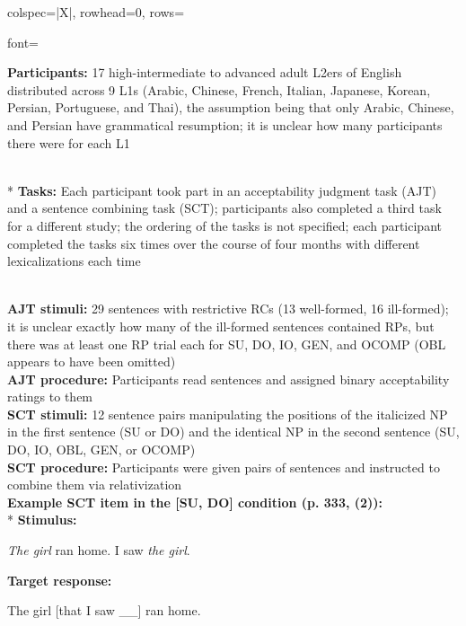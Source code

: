 \begin{longtblr}[caption={\textcite{gass1979}: Experimental design}, label={tblr:gass}]{colspec={|X|}, rowhead=0, rows={font=\raggedright{}}}\hline
\textbf{Participants:} 17 high-intermediate to advanced adult L2ers of English distributed across 9 L1s (Arabic, Chinese, French, Italian, Japanese, Korean, Persian, Portuguese, and Thai), the assumption being that only Arabic, Chinese, and Persian have grammatical resumption; it is unclear how many participants there were for each L1 \vspace{5pt}\rule{0pt}{10pt}\\*
\textbf{Tasks:} Each participant took part in an acceptability judgment task (AJT) and a sentence combining task (SCT); participants also completed a third task for a different study; the ordering of the tasks is not specified; each participant completed the tasks six times over the course of four months with different lexicalizations each time \vspace{5pt}\rule{0pt}{10pt}\\
\textbf{AJT stimuli:} 29 sentences with restrictive RCs (13 well-formed, 16 ill-formed); it is unclear exactly how many of the ill-formed sentences contained RPs, but there was at least one RP trial each for SU, DO, IO, GEN, and OCOMP (OBL appears to have been omitted)\vspace{5pt}\\
\textbf{AJT procedure:} Participants read sentences and assigned binary acceptability ratings to them \vspace{5pt}\\
\textbf{SCT stimuli:} 12 sentence pairs manipulating the positions of the italicized NP in the first sentence (SU or DO) and the identical NP in the second sentence (SU, DO, IO, OBL, GEN, or OCOMP) \vspace{5pt}\\
\textbf{SCT procedure:} Participants were given pairs of sentences and instructed to combine them via relativization \vspace{5pt}\\
\textbf{Example SCT item in the [SU, DO] condition (p. 333, (2)):} \vspace{5pt}\\*
\setlength{\leftskip}{10pt}\textbf{Stimulus:} \par\nobreak
\textit{The girl} ran home. I saw \textit{the girl}.
\par\nobreak\vspace{5pt} 
\textbf{Target response:} \par\nobreak
The girl [that I saw \_\_] ran home.
\\\hline
\end{longtblr}

